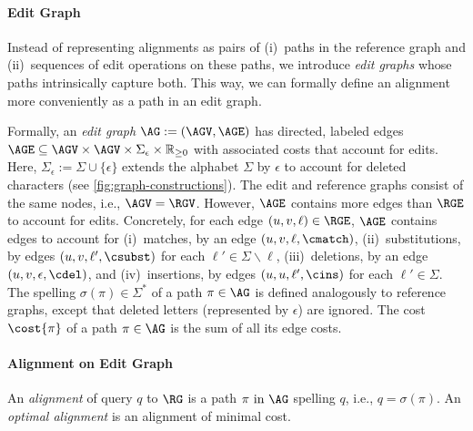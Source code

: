 \paragraph{Edit Graph}
Instead of representing alignments as pairs of (i)~paths in the reference graph and
(ii)~sequences of edit operations on these paths, we introduce \textit{edit
graphs} whose paths intrinsically capture both. This way, we can
formally define an alignment more conveniently as a path in an edit graph.

Formally, an \emph{edit graph} $\AG:=(\AGV,\AGE)$ has directed, labeled edges
$\AGE \subseteq \AGV \times \AGV \times \Sigma_\epsilon \times \mathbb{R}_{\geq
0}$ with associated costs that account for edits. Here, $\Sigma_\epsilon :=
\Sigma \cup \{\epsilon\}$ extends the alphabet $\Sigma$ by $\epsilon$ to account
for deleted characters (see \cref{fig:graph-constructions}).
%
The edit and reference graphs consist
of the same nodes, i.e., $\AGV=\RGV$. However, $\AGE$ contains more edges
than $\RGE$ to account for edits.
%
Concretely, for each edge $(u,v,\ell) \in \RGE$, $\AGE$ contains edges to
account for (i)~matches, by an edge $(u,v,\ell,\cmatch)$, (ii)~substitutions, by
edges $(u,v,\ell',\csubst)$ for each $\ell' \in \Sigma \backslash \ell$,
(iii)~deletions, by an edge $(u,v,\epsilon,\cdel)$, and (iv)~insertions, by
edges $(u,u,\ell',\cins)$ for each $\ell' \in \Sigma$.
%
The spelling $\sigma(\pi) \in \Sigma^*$ of a path $\pi \in \AG$ is defined
analogously to reference graphs, except that deleted letters (represented by
$\epsilon$) are ignored. The cost $\cost{\pi}$ of a path $\pi \in \AG$ is the
sum of all its edge costs.

\paragraph{Alignment on Edit Graph}
An \emph{alignment} of query $q$ to $\RG$ is a path $\pi \text{ in } \AG$
spelling $q$, i.e., $q=\sigma(\pi)$. An \emph{optimal alignment} is an alignment
of minimal cost.
